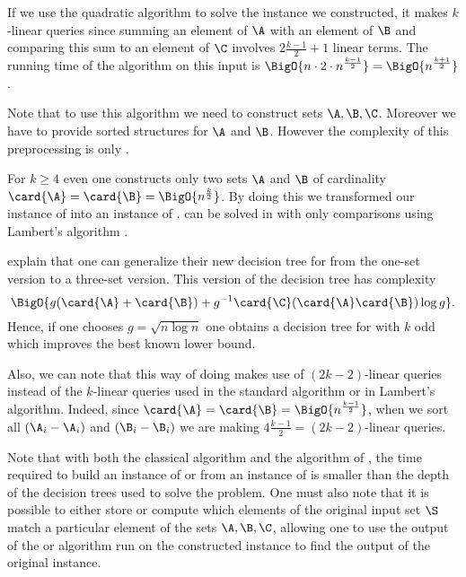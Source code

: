If we use the quadratic \threeSUM algorithm to solve the instance we
constructed, it makes \(k\)-linear queries since summing an element of
\(\A\) with an element of \(\B\) and comparing this sum to an element of
\(\C\) involves \(2 \frac{k-1}{2} + 1\) linear terms. The running time of
the \threeSUM algorithm on this input is \(\BigO{n \cdot 2 \cdot n^{\frac{k-1}{2}}} =
\BigO{n^{\frac{k+1}{2}}}\).

Note that to use this algorithm we need to construct sets \(\A,\B,\C\).
Moreover we have to provide sorted structures for \(\A\) and \(\B\). However
the complexity of this preprocessing is only .

For \(k \ge 4\) even one constructs only two sets \(\A\) and \(\B\) of
cardinality \(\card{\A} = \card{\B} = \BigO{n^{\frac{k}{2}}}\). By doing this
we transformed our instance of \kLDT into an instance of \twoSUM. \twoSUM can be
solved in  with only 
comparisons using Lambert's algorithm \cite{lambert:1990}.

\citet*{gronlund:2014} explain that one can generalize their new decision tree
for \threeSUM from the one-set version to a three-set version. This version of
the decision tree has complexity
\begin{displaymath}
\BigO{g(\card{\A}+\card{\B}) + g^{-1}\card{\C}(\card{\A}\card{\B})\log g}.
\end{displaymath}
Hence, if one chooses \(g = \sqrt{n \log n}\) one obtains a
 decision tree for \kLDT with $k$ odd
which improves the best known lower bound.

Also, we can note that this way of doing makes use of \((2k-2)\)-linear queries
instead of the \(k\)-linear queries used in the standard \threeSUM
algorithm or in Lambert's algorithm. Indeed, since \(\card{\A} = \card{\B} =
\BigO{n^{\frac{k-1}{2}}}\), when we sort all \((\A_i - \A_i)\) and \((\B_i -
\B_i)\) we are making \(4 \frac{k-1}{2} = (2k-2)\)-linear queries.

Note that with both the classical algorithm and the algorithm of
\citet*{gronlund:2014}, the time required to build an instance of \twoSUM or
\threeSUM from an instance of \kLDT is smaller than the depth of the decision
trees used to solve the problem. One must also note that it is possible to
either store or compute which elements of the original input set \(\S\) match a
particular element of the sets \(\A,\B,\C\), allowing one to use the output of
the \twoSUM or \threeSUM algorithm run on the constructed instance to find the
output of the original \kLDT instance.

